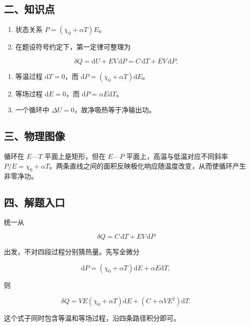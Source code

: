 \documentclass[12pt,a4paper,UTF8]{ctexart}
\newcommand{\tightlist}{\setlength{\itemsep}{0pt}\setlength{\parskip}{0pt}}
\begin{document}
\subsection{二、知识点}\label{ux4e8cux77e5ux8bc6ux70b9-5}

\begin{enumerate}
\def\labelenumi{\arabic{enumi}.}
\tightlist
\item
  状态关系 \(P=(\chi_0+\alpha T)E\)。
\item
  在题设符号约定下，第一定律可整理为
\end{enumerate}

\[\delta Q=\mathrm dU+EV\,\mathrm dP=C\,\mathrm dT+EV\,\mathrm dP.\]

\begin{enumerate}
\def\labelenumi{\arabic{enumi}.}
\setcounter{enumi}{2}
\tightlist
\item
  等温过程 \(\mathrm dT=0\)，而
  \(\mathrm dP=(\chi_0+\alpha T)\mathrm dE\)。
\item
  等场过程 \(\mathrm dE=0\)，而 \(\mathrm dP=\alpha E\mathrm dT\)。
\item
  一个循环中 \(\Delta U=0\)，故净吸热等于净输出功。
\end{enumerate}

\subsection{三、物理图像}\label{ux4e09ux7269ux7406ux56feux50cf-5}

循环在 \(E\)---\(T\) 平面上是矩形，但在 \(E\)---\(P\)
平面上，高温与低温对应不同斜率
\(P/E=\chi_0+\alpha T\)。两条直线之间的面积反映极化响应随温度改变，从而使循环产生非零净功。

\subsection{四、解题入口}\label{ux56dbux89e3ux9898ux5165ux53e3-5}

统一从

\[\delta Q=C\,\mathrm dT+EV\,\mathrm dP\]

出发，不对四段过程分别猜热量。先写全微分

\[\mathrm dP=(\chi_0+\alpha T)\mathrm dE+\alpha E\mathrm dT,\]

则

\[\delta Q
=V E(\chi_0+\alpha T)\mathrm dE
+(C+\alpha VE^2)\mathrm dT.\]

这个式子同时包含等温和等场过程，沿四条路径积分即可。
\end{document}
